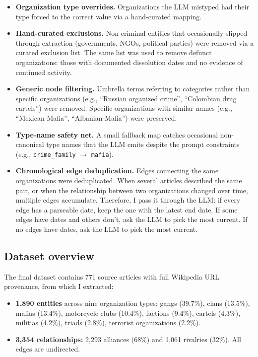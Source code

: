 \documentclass[11pt,a4paper]{article}
\begin{document}
\begin{itemize}[leftmargin=2em]
  \item \textbf{Organization type overrides.} Organizations the LLM mistyped had their type forced to the correct value via a hand-curated mapping.
  \item \textbf{Hand-curated exclusions.} Non-criminal entities that occasionally slipped through extraction (governments, NGOs, political parties) were removed via a curated exclusion list. The same list was used to remove defunct organizations: those with documented dissolution dates and no evidence of continued activity.
  \item \textbf{Generic node filtering.} Umbrella terms referring to categories rather than specific organizations (e.g., ``Russian organized crime'', ``Colombian drug cartels'') were removed. Specific organizations with similar names (e.g., ``Mexican Mafia'', ``Albanian Mafia'') were preserved.
  \item \textbf{Type-name safety net.} A small fallback map catches occasional non-canonical type names that the LLM emits despite the prompt constraints (e.g., \texttt{crime\_family} $\rightarrow$ \texttt{mafia}). 
   \item \textbf{Chronological edge deduplication.} Edges connecting the same organizations were deduplicated. When several articles described the same pair, or when the relationship between two organizations changed over time, multiple edges accumulate. Therefore, I pass it through the LLM: if every edge has a parseable date, keep the one with the latest end date. If some edges have dates and others don't, ask the LLM to pick the most current. If no edges have dates, ask the LLM to pick the most current.
\end{itemize}

\subsection{Dataset overview}

The final dataset contains 771 source articles with full Wikipedia URL provenance, from which I extracted:

\begin{itemize}[leftmargin=2em]
  \item \textbf{1{,}890 entities} across nine organization types: gangs (39.7\%), clans (13.5\%), mafias (13.4\%), motorcycle clubs (10.4\%), factions (9.4\%), cartels (4.3\%), militias (4.2\%), triads (2.8\%), terrorist organizations (2.2\%).
  \item \textbf{3{,}354 relationships:} 2{,}293 alliances (68\%) and 1{,}061 rivalries (32\%). All edges are undirected.
\end{itemize}
\end{document}
